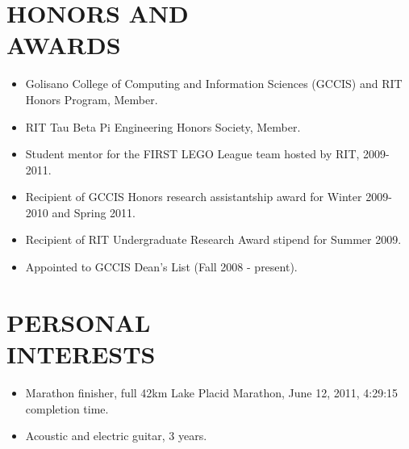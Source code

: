 \documentclass[line,margin]{res}
\begin{document}
\begin{resume}
\section{HONORS AND \\ AWARDS}
	\begin{itemize}
	\item Golisano College of Computing and Information Sciences (GCCIS) and RIT Honors Program, Member.
	\item RIT Tau Beta Pi Engineering Honors Society, Member.
	\item Student mentor for the FIRST LEGO League team hosted by RIT, 2009-2011.
	\item Recipient of GCCIS Honors research assistantship award for Winter 2009-2010 and Spring 2011.
	\item Recipient of RIT Undergraduate Research Award stipend for Summer 2009.
	\item Appointed to GCCIS Dean's List (Fall 2008 - present).
	\end{itemize}

\section{PERSONAL \\INTERESTS}
	\begin{itemize}
	\item Marathon finisher, full 42km Lake Placid Marathon, June 12, 2011, 4:29:15 completion time.
	\item Acoustic and electric guitar, 3 years.
	\end{itemize}

\end{resume}
\end{document}
